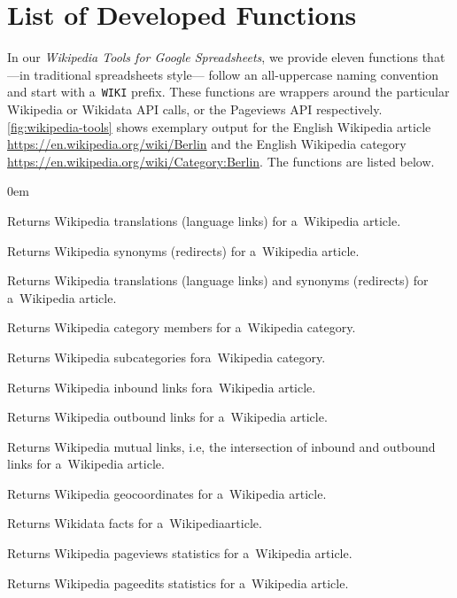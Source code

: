 \documentclass{sig-alternate-05-2015}
\newcommand{\inlinelistingsize}{\fontsize{8pt}{11pt}}
\let\oldurl\url
\renewcommand{\url}[1]{\inlinelistingsize\oldurl{#1}}
\begin{document}
\vspace{-2.5em}
\section{List of Developed Functions}

In our \emph{Wikipedia Tools for Google Spreadsheets}, we provide
eleven functions that---in traditional spreadsheets style---%
follow an all-uppercase naming convention and start with a~\texttt{WIKI} prefix.
These functions are wrappers around the particular Wikipedia or Wikidata API calls,
or the Pageviews API respectively.
\autoref{fig:wikipedia-tools} shows exemplary output for the English Wikipedia article
\url{https://en.wikipedia.org/wiki/Berlin} and the English Wikipedia category
\url{https://en.wikipedia.org/wiki/Category:Berlin}.
The functions are listed below.

\begin{description}[style=unboxed,leftmargin=1em]
  \itemsep0em
  \item[\texttt{WIKITRANSLATE}] Returns Wikipedia translations (language links) for a~Wikipedia article.
  \item[\texttt{WIKISYNONYMS}] Returns Wikipedia synonyms (redirects) for a~Wikipedia article.
  \item[\texttt{WIKIEXPAND}] Returns Wikipedia translations (language links) and synonyms (redirects) for a~Wikipedia article.
  \item[\texttt{WIKICATEGORYMEMBERS}] Returns Wikipedia category members for a~Wikipedia category.
  \item[\texttt{WIKISUBCATEGORIES}] Returns Wikipedia subcategories for\linebreak a~Wikipedia category.
  \item[\texttt{WIKIINBOUNDLINKS}] Returns Wikipedia inbound links for\linebreak a~Wikipedia article.
  \item[\texttt{WIKIOUTBOUNDLINKS}] Returns Wikipedia outbound links for a~Wikipedia article.
  \item[\texttt{WIKIMUTUALLINKS}] Returns Wikipedia mutual links, i.e, the intersection of inbound and outbound links for a~Wikipedia article.
  \item[\texttt{WIKIGEOCOORDINATES}] Returns Wikipedia geocoordinates for a~Wikipedia article.
  \item[\texttt{WIKIDATAFACTS}] Returns Wikidata facts for a~Wikipedia\linebreak article.
  \item[\texttt{WIKIPAGEVIEWS}] Returns Wikipedia pageviews statistics for a~Wikipedia article.
  \item[\texttt{WIKIPAGEEDITS}] Returns Wikipedia pageedits statistics for a~Wikipedia article.
\end{description}
\end{document}
